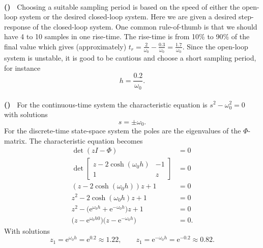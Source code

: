 \documentclass[letterpaper,12pt]{scrartcl}
\newenvironment{exercise}[1][Problem]{\begin{trivlist} \item[\hskip
    \labelsep {\stepcounter{exerctr}\bfseries #1
      \arabic{exerctr}}]}{\end{trivlist}\vspace{10mm}}
\newcounter{exerctr}
\newcounter{abcctr}[exerctr]
\newcommand{\abc}{\noindent\vspace{1mm}\\ {\bf
    \stepcounter{abcctr}(\alph{abcctr})\ }}
\newcommand{\bbm}{\begin{bmatrix}}
\newcommand{\ebm}{\end{bmatrix}}
\newcommand{\mexp}[1]{\ensuremath{\mathrm{e}^{#1}}}
\begin{document}
\setcounter{exerctr}{0} 

\begin{exercise}
\abc%
Choosing a suitable sampling period is based on the speed of either the open-loop system or the desired closed-loop system. Here we are given a desired step-response of the closed-loop system. One common rule-of-thumb is that we should have 4 to 10 samples in one rise-time. The rise-time is from 10\% to 90\% of the final value which gives (approximately) $t_r = \frac{2}{\omega_0} - \frac{0.3}{\omega_0} = \frac{1.7}{\omega_0}$. Since the open-loop system is unstable, it is good to be cautious and choose a short sampling period, for instance
\[ h = \frac{0.2}{\omega_0}.\]
\abc%
For the continuous-time system the characteristic equation is 
\( s^2 - \omega_0^2 = 0\) with solutions \[s = \pm \omega_0.\]
For the discrete-time state-space system the poles are the eigenvalues of the $\Phi$-matrix. The characteristic equation becomes
\begin{equation*}
  \begin{aligned}
    \det \left( zI - \Phi\right) &= 0\\
    \det \bbm z - 2\cosh(\omega_0h) & -1\\1 & z \ebm &= 0\\
    (z-2\cosh(\omega_0h))z + 1 &= 0\\
    z^2 - 2\cosh(\omega_0h)z + 1 &= 0\\
    z^2 - \big(\mexp{\omega_0h} + \mexp{-\omega_0h}\big)z + 1 &= 0\\
    \big(z - \mexp{\omega_0h0}\big)\big(z - \mexp{-\omega_0h}\big) &= 0.
  \end{aligned}
\end{equation*}
With solutions 
\[z_1 = \mexp{\omega_0h} = \mexp{0.2} \approx 1.22,\qquad  z_1 = \mexp{-\omega_0h} = \mexp{-0.2} \approx 0.82.\]
\begin{center}
\end{center}
\end{exercise}
\end{document}
